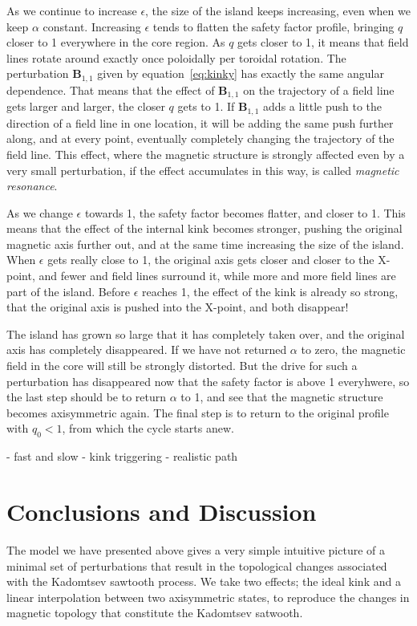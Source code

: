 \documentclass[%
superscriptaddress,
amsmath,amssymb,
aps,
pre,
floatfix,
]{revtex4-2}
\begin{document}
As we continue to increase  $\epsilon$, the size of the island keeps increasing, even when we keep $\alpha$ constant. 
Increasing $\epsilon$ tends to flatten the safety factor profile, bringing $q$ closer to 1 everywhere in the core region.
As $q$ gets closer to 1, it means that field lines rotate around exactly once poloidally per toroidal rotation. 
The perturbation $\mathbf{B}_{1,1}$ given by equation~\eqref{eq:kinky} has exactly the same angular dependence. 
That means that the effect of $\mathbf{B}_{1,1}$ on the trajectory of a field line gets larger and larger, the closer $q$ gets to 1. 
If $\mathbf{B}_{1,1}$ adds a little push to the direction of a field line in one location, it will be adding the same push further along, and at every point, eventually completely changing the trajectory of the field line. 
This effect, where the magnetic structure is strongly affected even by a very small perturbation, if the effect accumulates in this way, is called \emph{magnetic resonance}. 

As we change $\epsilon$ towards 1, the safety factor becomes flatter, and closer to 1. 
This means that the effect of the internal kink becomes stronger, pushing the original magnetic axis further out, and at the same time increasing the size of the island.
When $\epsilon$ gets really close to 1, the original axis gets closer and closer to the X-point, and fewer and field lines surround it, while more and more field lines are part of the island. 
Before $\epsilon$ reaches 1, the effect of the kink is already so strong, that the original axis is pushed into the X-point, and both disappear!

The island has grown so large that it has completely taken over, and the original axis has completely disappeared. 
If we have not returned $\alpha$ to zero, the magnetic field in the core will still be strongly distorted. 
But the drive for such a perturbation has disappeared now that the safety factor is above 1 everyhwere, so the last step should be to return $\alpha$ to 1, and see that the magnetic structure becomes axisymmetric again. 
The final step is to return to the original profile with $q_0<1$, from which the cycle starts anew. 

- fast and slow
- kink triggering
- realistic path

\section*{Conclusions and Discussion}
The model we have presented above gives a very simple intuitive picture of a minimal set of perturbations that result in the topological changes associated with the Kadomtsev sawtooth process. 
We take two effects; the ideal kink and a linear interpolation between two axisymmetric states, to reproduce the changes in magnetic topology that constitute the Kadomtsev satwooth. 
\end{document}
